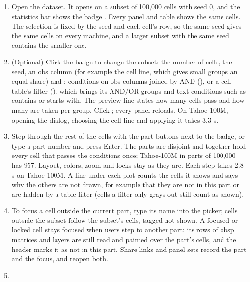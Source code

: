 \begin{enumerate}
\def\labelenumi{\arabic{enumi}.}
\setcounter{enumi}{31}
\tightlist
\item
  Open the dataset. It opens on a subset of 100,000 cells with seed 0, and the statistics bar shows the badge . Every panel and table shows the same cells. The selection is fixed by the seed and each cell's row, so the same seed gives the same cells on every machine, and a larger subset with the same seed contains the smaller one.
\item
  (Optional) Click the badge to change the subset: the number of cells, the seed,  an obs column (for example the cell line, which gives small groups an equal share) and : conditions on obs columns joined by AND (), or a cell table's filter (), which brings its AND/OR groups and text conditions such as contains or starts with. The preview line states how many cells pass and how many are taken per group. Click ; every panel reloads.
  On Tahoe-100M, opening the dialog, choosing  the cell line and applying it takes 3.3 s.
\item
  Step through the rest of the cells with the part buttons next to the badge, or type a part number and press Enter. The parts are disjoint and together hold every cell that passes the conditions once; Tahoe-100M in parts of 100,000 has 957. Layout, colors, zoom and locks stay as they are.
  Each step takes 2.8 s on Tahoe-100M. A line under each plot counts the cells it shows and says why the others are not drawn, for example that they are not in this part or are hidden by a table filter (cells a filter only grays out still count as shown).
\item
  To focus a cell outside the current part, type its name into the  picker; cells outside the subset follow the subset's cells, tagged not shown. A focused or locked cell stays focused when users step to another part: its rows of obsp matrices and layers are still read and painted over the part's cells, and the header marks it as not in this part. Share links and panel sets record the part and the focus, and reopen both.
\troubleshoot{}
\item

\end{enumerate}
